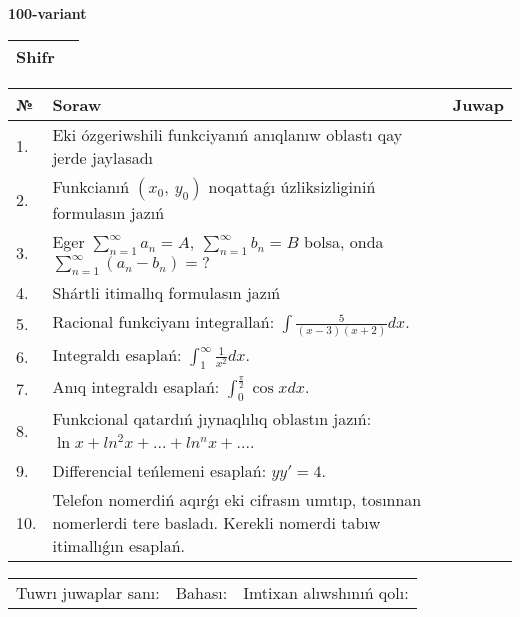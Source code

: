 \documentclass{article}
\begin{document}
  \egroup
  
  \newpage
  
  
  \textbf{100-variant}\\
  
  \bgroup
  \def\arraystretch{1.6} %
  
  \begin{tabular}{|m{5.7cm}|m{9.5cm}|}
  \hline
  Shifr & \\
  \hline
  \end{tabular}
  
  \vspace{1cm}
  
  \begin{tabular}{|m{0.7cm}|m{10cm}|m{4cm}|}
  \hline
  № & Soraw & Juwap \\
  \hline
  1. & Eki ózgeriwshili funkciyanıń anıqlanıw oblastı qay jerde jaylasadı &  \\
  \hline
  2. & Funkcianıń \((x_{0},\ y_{0})\) noqattaǵı úzliksizliginiń formulasın jazıń &  \\
  \hline
  3. & Eger \(\sum_{n = 1}^{\infty}a_{n} = A,\ \sum_{n = 1}^{\infty}b_{n} = B\) bolsa, onda \(\sum_{n = 1}^{\infty}\left( a_{n} - b_{n} \right) = ?\) &  \\
  \hline
  4. & Shártli itimallıq formulasın jazıń &  \\
  \hline
  5. & Racional funkciyanı integrallań: \(\int{\frac{5}{(x - 3)(x + 2)}dx}\). &  \\
  \hline
  6. & Integraldı esaplań: \(\int_{1}^{\infty}{\frac{1}{x^2 }dx}\). &  \\
  \hline
  7. & Anıq integraldı esaplań: \(\int_{0}^{\frac{\pi}{2}}{\cos xdx}\). &  \\
  \hline
  8. & Funkcional qatardıń jıynaqlılıq oblastın jazıń: \(\ln x + ln^2 x + ... + ln^{n}x + ...\). &  \\
  \hline
  9. & Differencial teńlemeni esaplań: \(yy' = 4\). &  \\
  \hline
  10. & Telefon nomerdiń aqırǵı eki cifrasın umıtıp, tosınnan nomerlerdi tere basladı. Kerekli nomerdi tabıw itimallıǵın esaplań. &  \\
  \hline
  \end{tabular}
  
  \vspace{1cm}
  
  \begin{tabular}{lll}
  Tuwrı juwaplar sanı: \underline{\hspace{1.5cm}} & 
  Bahası: \underline{\hspace{1.5cm}} & 
  Imtixan alıwshınıń qolı: \underline{\hspace{2cm}} \\
  \end{tabular}
  
  \egroup
  
  \newpage
  
  
\end{document}
